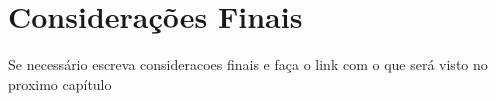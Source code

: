 

\section{Considerações Finais}
Se necessário escreva consideracoes finais e faça o link com o que será visto no proximo capítulo
